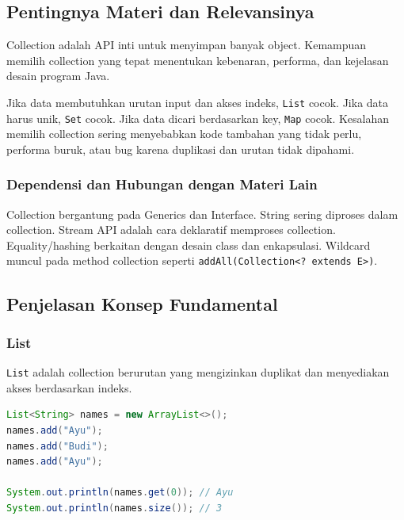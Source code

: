 \subsection{Pentingnya Materi dan Relevansinya}

\begin{jawab}
Collection adalah API inti untuk menyimpan banyak object. Kemampuan memilih collection yang tepat menentukan kebenaran, performa, dan kejelasan desain program Java.
\end{jawab}

Jika data membutuhkan urutan input dan akses indeks, \texttt{List} cocok. Jika data harus unik, \texttt{Set} cocok. Jika data dicari berdasarkan key, \texttt{Map} cocok. Kesalahan memilih collection sering menyebabkan kode tambahan yang tidak perlu, performa buruk, atau bug karena duplikasi dan urutan tidak dipahami.

\subsubsection{Dependensi dan Hubungan dengan Materi Lain}

Collection bergantung pada Generics dan Interface. String sering diproses dalam collection. Stream API adalah cara deklaratif memproses collection. Equality/hashing berkaitan dengan desain class dan enkapsulasi. Wildcard muncul pada method collection seperti \texttt{addAll(Collection<? extends E>)}.

\subsection{Penjelasan Konsep Fundamental}

\subsubsection{List}

\begin{jawab}
\texttt{List} adalah collection berurutan yang mengizinkan duplikat dan menyediakan akses berdasarkan indeks.
\end{jawab}

\begin{lstlisting}[language=Java, caption={Penggunaan List}, label={lst:list-basic}]
List<String> names = new ArrayList<>();
names.add("Ayu");
names.add("Budi");
names.add("Ayu");

System.out.println(names.get(0)); // Ayu
System.out.println(names.size()); // 3
\end{lstlisting}

